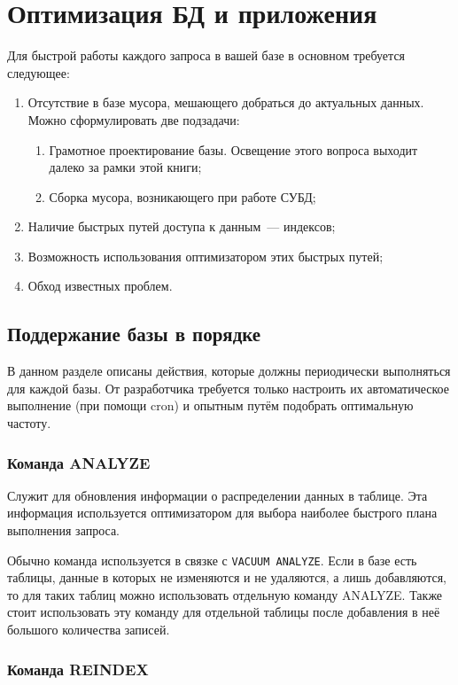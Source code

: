 \section{Оптимизация БД и приложения}
Для быстрой работы каждого запроса в вашей базе в основном требуется следующее:

\begin{enumerate}
  \item Отсутствие в базе мусора, мешающего добраться до актуальных данных. Можно сформулировать две подзадачи:
  \begin{enumerate}
    \item Грамотное проектирование базы. Освещение этого вопроса выходит далеко за рамки этой книги;
    \item Сборка мусора, возникающего при работе СУБД;
  \end{enumerate}
  \item Наличие быстрых путей доступа к данным~--- индексов;
  \item Возможность использования оптимизатором этих быстрых путей;
  \item Обход известных проблем.
\end{enumerate}


\subsection{Поддержание базы в порядке}

В данном разделе описаны действия, которые должны периодически выполняться для каждой базы. От разработчика требуется только настроить их автоматическое выполнение (при помощи cron) и опытным путём подобрать оптимальную частоту.


\subsubsection{Команда ANALYZE}

Служит для обновления информации о распределении данных в таблице. Эта информация используется оптимизатором для выбора наиболее быстрого плана выполнения запроса.

Обычно команда используется в связке с \lstinline!VACUUM ANALYZE!. Если в базе есть таблицы, данные в которых не изменяются и не удаляются, а лишь добавляются, то для таких таблиц можно использовать отдельную команду ANALYZE. Также стоит использовать эту команду для отдельной таблицы после добавления в неё большого количества записей.


\subsubsection{Команда REINDEX}

